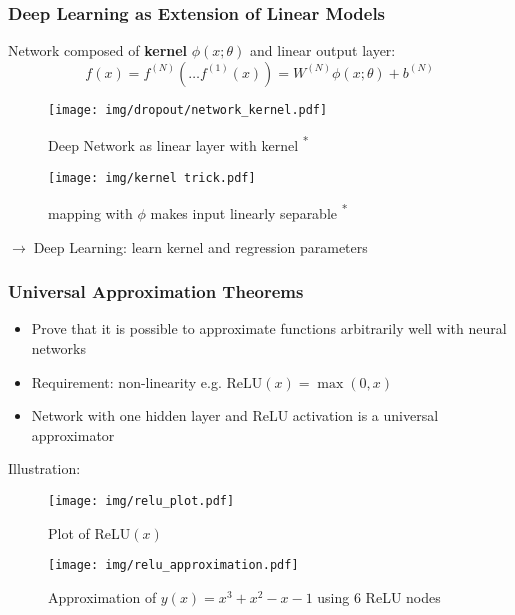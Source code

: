 \documentclass{beamer}
\newcommand{\arrow}{$\rightarrow\;$}
\renewcommand{\k}[2]{#1^{(#2)}}
\begin{document}
\begin{frame}
    \frametitle{Deep Learning as Extension of Linear Models}
    Network composed of \textbf{kernel} $\phi(x; \theta)$ and linear output layer:
    \begin{equation*}
        f(x) = \k{f}{N}(\ldots \k{f}{1}(x)) = \k{W}{N}\phi(x; \theta) + \k{b}{N}
    \end{equation*}
    
    \begin{minipage}[b]{0.49\textwidth}
        \begin{figure}
            \texttt{[image: img/dropout/network\_kernel.pdf]}
            \caption{Deep Network as linear layer with kernel \cite{dropout}\textsuperscript{*}}
        \end{figure}
    \end{minipage}
    \begin{minipage}[b]{0.49\textwidth}
        \begin{figure}
            \texttt{[image: img/kernel trick.pdf]}
            \caption{mapping with $\phi$ makes input linearly separable \cite{kernel}\textsuperscript{*}}
        \end{figure}
    \end{minipage}
    
    \arrow Deep Learning: learn kernel and regression parameters
\end{frame}

\begin{frame}
    \frametitle{Universal Approximation Theorems}
    \begin{itemize}
        \item Prove that it is possible to approximate functions arbitrarily well with neural networks
        \item Requirement: non-linearity e.g. $\text{ReLU}(x) = \max(0, x)$
        \item Network with one hidden layer and ReLU activation is a universal approximator
    \end{itemize}
    Illustration:
    
    \begin{minipage}[t]{0.49\textwidth}
        \begin{figure}
            \texttt{[image: img/relu\_plot.pdf]}
            \caption{Plot of ReLU$(x)$}
        \end{figure}
    \end{minipage}
    \begin{minipage}[t]{0.49\textwidth}
        \begin{figure}
            \texttt{[image: img/relu\_approximation.pdf]}
            \caption{Approximation of $y(x) = x^3+x^2-x-1$ using 6 ReLU nodes}
        \end{figure}
    \end{minipage}

\end{frame}
\end{document}
